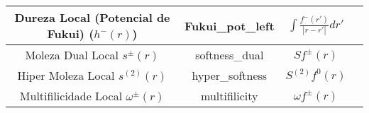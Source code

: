 \documentclass[a4paper,11pt]{refart}
\begin{document}
\begin{minipage}{\fullwidth}
\begin{table}[H]
\begin{tabular}{c|c|c|c}
			\makecell{Dureza Local \\(Potencial\\ de Fukui) ($h^{-}(r)$)}  & Fukui\_pot\_left  & $\int   \frac{f^{-}(r')}{|r - r'|}dr'$ &  \\ \hline
			\makecell{Moleza Dual\\ Local $s^{\pm}(r)$}  & softness\_dual & $Sf^{\pm}(r)$  &   \\ \hline
			\makecell{Hiper Moleza\\Local $s^{(2)}(r)$ }  & hyper\_softness & $S^{(2)}f^{0}(r)$ &   \\ \hline
			\makecell{Multifilicidade\\Local $ \omega^{\pm}(r)$}  & multifilicity & $\omega f^{\pm}(r)$ &   \\
			\bottomrule
		\end{tabular} 
		\label{tab_local1}	
	\end{table}	
\end{minipage}
\end{document}
